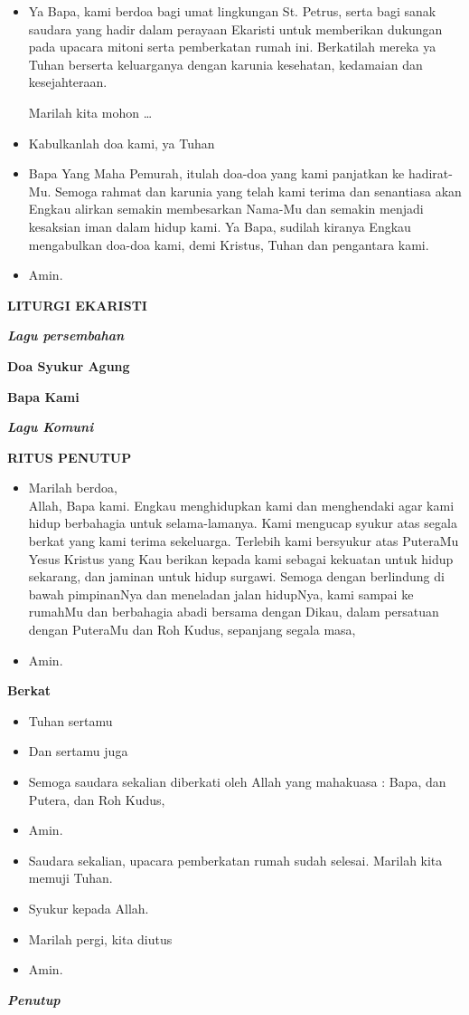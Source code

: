\documentclass[12pt,twoside]{book}
\makeatletter
\newcommand{\judul}[1]{%
  {\parindent \z@ \centering \normalfont
    \interlinepenalty\@M \large \bfseries #1\par\nobreak \vskip 20\p@ }}
\newcommand{\subjudul}[1]{%
  {\parindent \z@ \normalfont
    \interlinepenalty\@M \bfseries #1\par\nobreak \vskip 20\p@ }}
\newcommand{\lagu}[1]{%
  {\parindent \z@ \normalfont
    \interlinepenalty\@M \bfseries \emph{#1}\par\nobreak \vskip 20\p@ }}
\newcommand{\BU}[1]{\begin{itemize} \item[U:] #1 \end{itemize}}
\newcommand{\BI}[1]{\begin{itemize} \item[I:] #1 \end{itemize}}
\newcommand{\BP}[1]{\begin{itemize} \item[P:] #1 \end{itemize}}
\makeatother
\begin{document}
\BP{Ya Bapa, kami berdoa bagi umat lingkungan St. Petrus, serta bagi sanak saudara yang hadir dalam perayaan Ekaristi untuk memberikan dukungan pada upacara mitoni serta pemberkatan rumah ini. Berkatilah mereka ya Tuhan berserta keluarganya dengan karunia kesehatan, kedamaian dan kesejahteraan.

Marilah kita mohon \ldots}

\BU{Kabulkanlah doa kami, ya Tuhan}

\BI{Bapa Yang Maha Pemurah, itulah doa-doa yang kami panjatkan ke hadirat-Mu. Semoga rahmat dan karunia yang telah kami terima dan senantiasa akan Engkau alirkan semakin membesarkan Nama-Mu dan semakin menjadi kesaksian iman dalam hidup kami. Ya Bapa, sudilah kiranya Engkau mengabulkan doa-doa kami, demi Kristus, Tuhan dan pengantara kami.}

\BU{Amin.}

\judul{LITURGI EKARISTI}

\lagu{Lagu persembahan}


\subjudul{Doa Syukur Agung}

\subjudul{Bapa Kami}

\lagu{Lagu Komuni}

\judul{RITUS PENUTUP}

\BI{Marilah berdoa,\\
Allah, Bapa kami. Engkau menghidupkan kami dan menghendaki agar kami hidup berbahagia untuk selama-lamanya. Kami mengucap syukur atas segala berkat yang kami terima sekeluarga. Terlebih kami bersyukur atas PuteraMu Yesus Kristus yang Kau berikan kepada kami sebagai kekuatan untuk hidup sekarang, dan jaminan untuk hidup surgawi. Semoga dengan berlindung di bawah pimpinanNya dan meneladan jalan hidupNya, kami sampai ke rumahMu dan berbahagia abadi bersama dengan Dikau, dalam persatuan dengan PuteraMu dan Roh Kudus, sepanjang segala masa,}
\BU{Amin.}

\subjudul{Berkat}

\BI{Tuhan sertamu}
\BU{Dan sertamu juga}
\BI{Semoga saudara sekalian diberkati oleh Allah yang mahakuasa :
\Cross {~}Bapa, dan Putera, dan Roh Kudus,}
\BU{Amin.}
\BI{Saudara sekalian, upacara pemberkatan rumah sudah selesai.
Marilah kita memuji Tuhan.}
\BU{Syukur kepada Allah.}
\BI{Marilah pergi, kita diutus}
\BU{Amin.}

\lagu{Penutup}


\end{document}
